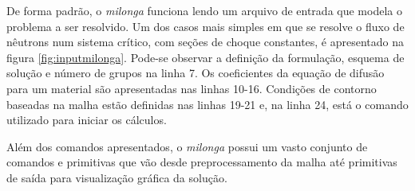 





De forma padrão, o \textit{milonga} funciona lendo um arquivo de entrada que modela o
problema a ser resolvido. Um dos casos mais simples em que se resolve o fluxo de nêutrons
num sistema crítico, com seções de choque constantes, é apresentado na figura \ref{fig:inputmilonga}.
Pode-se observar a definição da formulação, esquema de solução e número de grupos na linha 7.
Os coeficientes da equação de difusão para um material são apresentadas nas linhas 10-16.
Condições de contorno baseadas na malha estão definidas nas linhas 19-21 e, na linha 24,
está o comando utilizado para iniciar os cálculos.

Além dos comandos apresentados, o \textit{milonga} possui um vasto conjunto de comandos e primitivas
que vão desde preprocessamento da malha até primitivas de saída para visualização gráfica da
solução.

